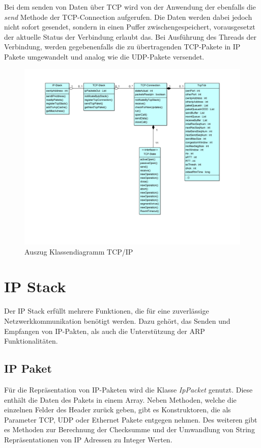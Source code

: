 Bei dem senden von Daten über TCP wird von der Anwendung der ebenfalls die \textit{send} Methode der TCP-Connection aufgerufen. Die Daten werden dabei jedoch nicht sofort gesendet, sondern in einen Puffer zwischengespeichert, vorausgesetzt der aktuelle Status der Verbindung erlaubt das. Bei Ausführung des Threads der Verbindung, werden gegebenenfalls die zu übertragenden TCP-Pakete in IP Pakete umgewandelt und analog wie die UDP-Pakete versendet. 


\begin{figure}[h]
	\centering
	\includegraphics[width=1\textwidth]{Graphics/TCPStack.png}
	\caption{Auszug Klassendiagramm TCP/IP}		
\end{figure}


\section{IP Stack}
Der IP Stack erfüllt mehrere Funktionen, die für eine zuverlässige Netzwerkkommunikation benötigt werden. Dazu gehört, das Senden und Empfangen von IP-Pakten, als auch die Unterstützung der ARP Funktionalitäten.

\subsection{IP Paket}
Für die Repräsentation von IP-Paketen wird die Klasse \textit{IpPacket} genutzt. Diese enthält die Daten des Pakets in einem Array. Neben Methoden, welche die einzelnen Felder des Header zurück geben, gibt es Konstruktoren, die als Parameter TCP, UDP oder Ethernet Pakete entgegen nehmen. Des weiteren gibt es Methoden zur Berechnung der Checksumme und der Umwandlung von String Repräsentationen von IP Adressen zu Integer Werten.  

